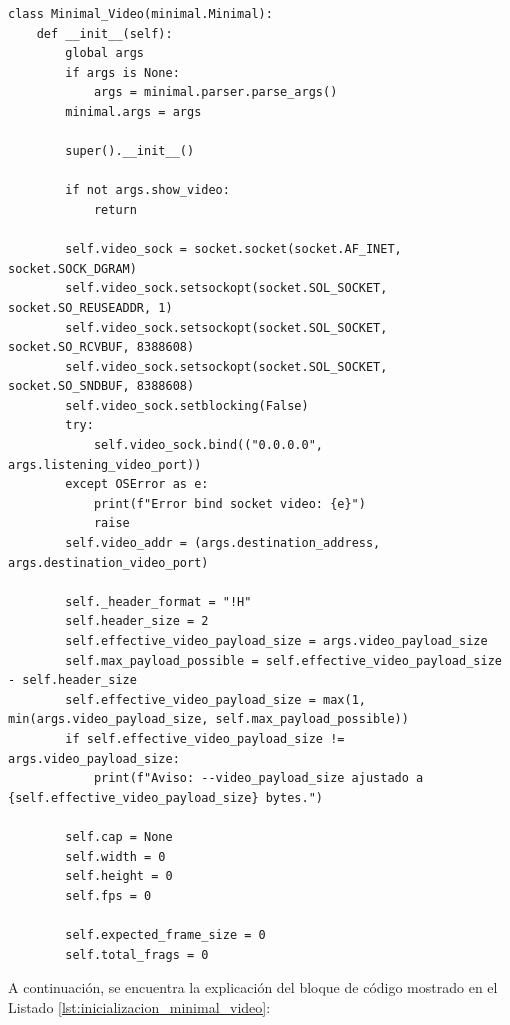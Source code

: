\begin{lstlisting}[style=pythonstyle, caption={Comienzo de la clase \textit{Minimal\_Video} y parte de la inicialización.}, label={lst:inicializacion_minimal_video}]
class Minimal_Video(minimal.Minimal):
    def __init__(self):
        global args
        if args is None:
            args = minimal.parser.parse_args()
        minimal.args = args

        super().__init__()

        if not args.show_video:
            return

        self.video_sock = socket.socket(socket.AF_INET, socket.SOCK_DGRAM)
        self.video_sock.setsockopt(socket.SOL_SOCKET, socket.SO_REUSEADDR, 1)
        self.video_sock.setsockopt(socket.SOL_SOCKET, socket.SO_RCVBUF, 8388608)
        self.video_sock.setsockopt(socket.SOL_SOCKET, socket.SO_SNDBUF, 8388608)
        self.video_sock.setblocking(False)
        try:
            self.video_sock.bind(("0.0.0.0", args.listening_video_port))
        except OSError as e:
            print(f"Error bind socket video: {e}")
            raise
        self.video_addr = (args.destination_address, args.destination_video_port)

        self._header_format = "!H"
        self.header_size = 2
        self.effective_video_payload_size = args.video_payload_size
        self.max_payload_possible = self.effective_video_payload_size - self.header_size
        self.effective_video_payload_size = max(1, min(args.video_payload_size, self.max_payload_possible))
        if self.effective_video_payload_size != args.video_payload_size:
            print(f"Aviso: --video_payload_size ajustado a {self.effective_video_payload_size} bytes.")

        self.cap = None
        self.width = 0
        self.height = 0
        self.fps = 0

        self.expected_frame_size = 0
        self.total_frags = 0
\end{lstlisting}

A continuación, se encuentra la explicación del bloque de código mostrado en el Listado \ref{lst:inicializacion_minimal_video}:

